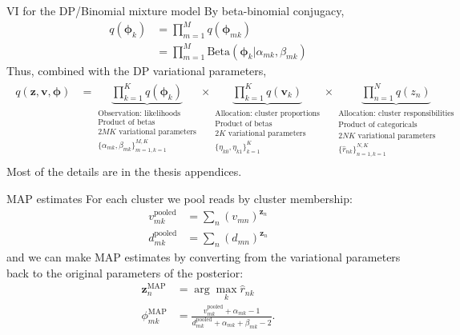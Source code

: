 \documentclass{beamer}
\newcommand{\bz}{\ensuremath{\mathbf{z}}}
\begin{document}
\begin{frame}{VI for the DP/Binomial mixture model}
By beta-binomial conjugacy, 
\begin{align*}
q(\bm{\phi}_k)  &= \prod\limits_{m=1}^M q(\bm{\phi}_{mk}) \\
				&= \prod\limits_{m=1}^M \mathrm{Beta}(\bm{\phi}_k | \alpha_{mk}, \beta_{mk})
\end{align*}
\pause
Thus, combined with the DP variational parameters,
	\begin{gather}
	\begin{align}
	    q(\bz, \mathbf{v}, \bm{\phi}) &=
	\underbrace{\prod\limits_{k=1}^K q(\bm{\phi}_k)}_{\substack{\text{Observation: likelihoods}  \\  \text{Product of betas} \\ 2MK \text{ variational parameters} \\  \{\alpha_{mk}, \beta_{mk} \}_{m=1, k=1}^{M, K} }} \times
	 \underbrace{\prod\limits_{k=1}^K q(\mathbf{v}_k)}_{\substack{\text{Allocation: cluster proportions} \\ \text{Product of betas} \\ 2K \text{ variational parameters}  \\ \{\eta_{k0}, \eta_{k1}\}_{k=1}^K   }} \times
	 \underbrace{\prod\limits_{n=1}^{N} q(z_n)}_{\substack{ \text{Allocation: cluster responsibilities} \\ \text{Product of categoricals} \\ 2NK \text{ variational parameters}  \\ \{\hat{r}_{nk}\}_{n=1, k=1}^{N, K}   }}\nonumber
	 \end{align}
	\end{gather}
Most of the details are in the thesis appendices.
\end{frame}

\begin{frame}{MAP estimates}
For each cluster we pool reads by cluster membership:
\begin{align*}
v_{mk}^{\text{pooled}} &= \sum_n (v_{mn})^{\bz_n} \\
d_{mk}^{\text{pooled}} &= \sum_n (d_{mn})^{\bz_n}
\end{align*}
\pause
and we can make MAP estimates by converting from the variational parameters back to the original parameters of the posterior:
\begin{align*}
\bz_n^{\text{MAP}} &= \arg \max_k \hat{r}_{nk}  \\[8pt]
\phi_{mk}^{\text{MAP}} &= \frac{v_{mk}^{\text{pooled}} + \alpha_{mk} - 1}{d_{mk}^{\text{pooled}} + \alpha_{mk} + \beta_{mk} - 2}.
\end{align*}
\end{frame}
\end{document}

